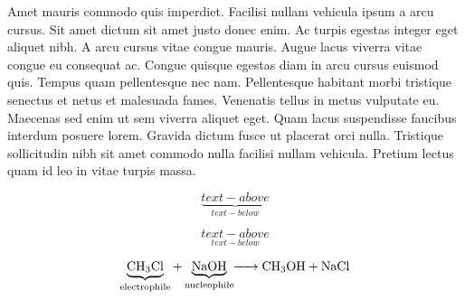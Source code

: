 \documentclass[letterpaper,\myfontsize]{article}
\newcommand*\mytref[7]{\bibitem{#1}#2 ``#3.'' \textit{#4} \textbf{#5}, \textit{#6}, #7.} %
\newcommand*\myzref[8]{\bibitem{#1}#2 ``#3.'' \textit{#4} \textbf{#5}, \textit{#6}(#7), #8.} %
\begin{document}
Amet mauris commodo quis imperdiet. Facilisi nullam vehicula ipsum a arcu cursus. Sit amet dictum sit amet justo donec enim. Ac turpis egestas integer eget aliquet nibh. A arcu cursus vitae congue mauris. Augue lacus viverra vitae congue eu consequat ac. Congue quisque egestas diam in arcu cursus euismod quis. Tempus quam pellentesque nec nam. Pellentesque habitant morbi tristique senectus et netus et malesuada fames. Venenatis tellus in metus vulputate eu. Maecenas sed enim ut sem viverra aliquet eget. Quam lacus suspendisse faucibus interdum posuere lorem. Gravida dictum fusce ut placerat orci nulla. Tristique sollicitudin nibh sit amet commodo nulla facilisi nullam vehicula. Pretium lectus quam id leo in vitae turpis massa.


\begin{equation}
\label{eq:born}
\underbrace{text-above}_{text-below}
\end{equation}

\begin{equation}
\label{eq:bornp}
\underset{text-below}{text-above}
\end{equation}

\begin{equation*}
\underbrace{\ce{CH3Cl}}_{\textnormal{electrophile}} + \underbrace{\ce{NaOH}}_{\textnormal{nucleophile}} \hskip-.5em\ce{-> CH3OH + NaCl}
\end{equation*}


\begin{center}
\end{center} 

\printbibliography

\end{document}
